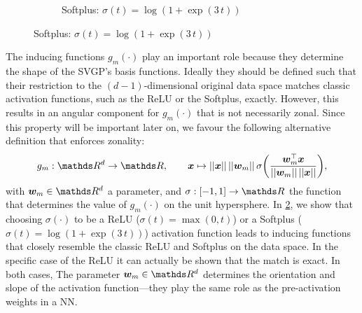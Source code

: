 \begin{figure}[t]
\begin{subfigure}[b]{0.49\textwidth}
        \caption{Softplus: $\sigma(t) = \log(1 + \exp(3\,t))$}
         \label{fig:projection:softplus}
     \end{subfigure}
   \label{fig:projection}
\end{figure}

The inducing functions $g_m(\cdot)$ play an important role because they determine the shape of the SVGP's basis functions. Ideally they should be defined such that their restriction to the $(d - 1)$-dimensional original data space matches classic activation functions, such as the ReLU or the Softplus, exactly. However, this results in an angular component for $g_m(\cdot)$ that is not necessarily zonal. Since this property will be important later on, we favour the following alternative definition that enforces zonality:
\begin{equation}
\label{eq:def-inducing-function}
    g_m: \Reals^d \rightarrow \Reals,\qquad \vx \mapsto \norm{\vx}\,\norm{\vw_m}\, \sigma\left(\frac{\vw_m^\top \vx}{\norm{\vw_m}\,\norm{\vx}}\right), 
\end{equation}
with $\vw_m \in \Reals^d$ a parameter, and $\sigma: [-1, 1] \rightarrow \Reals$ the function that determines the value of $g_m(\cdot)$ on the unit hypersphere. In \cref{fig:projection}, we show that choosing $\sigma(\cdot)$ to be a ReLU ($\sigma(t) = \max(0, t)$) or a Softplus ($\sigma(t) = \log(1 + \exp(3\,t))$) activation function leads to inducing functions that closely resemble the classic ReLU and Softplus on the data space. In the specific case of the ReLU it can actually be shown that the match is exact. In both cases, The parameter $\vw_m \in \Reals^d$ determines the orientation and slope of the activation function---they play the same role as the pre-activation weights in a NN.

